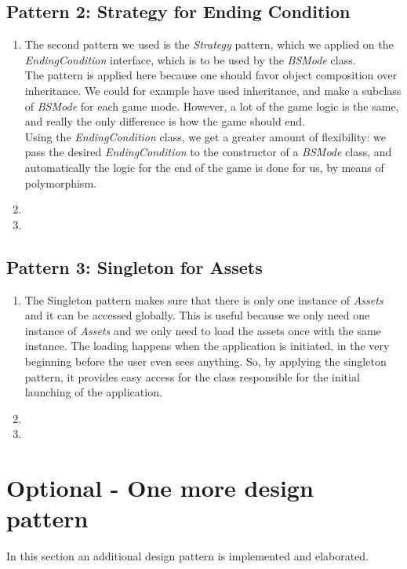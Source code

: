 \documentclass[a4paper,11pt]{article}
\begin{document}
\subsection{Pattern 2: Strategy for Ending Condition}
\begin{enumerate}
\item The second pattern we used is the \textit{Strategy} pattern, which we applied on the \textit{EndingCondition} interface, which is to be used by the \textit{BSMode} class. \\
The pattern is applied here because one should favor object composition over inheritance. We could for example have used inheritance, and make a subclass of \textit{BSMode} for each game mode. However, a lot of the game logic is the same, and really the only difference is how the  game should end.\\
Using the \textit{EndingCondition} class, we get a greater amount of flexibility: we pass the desired \textit{EndingCondition} to the constructor of a \textit{BSMode} class, and automatically the logic for the end of the game is done for us, by means of polymorphism.\\
\item
\item
\end{enumerate}

\subsection{Pattern 3: Singleton for Assets}
\begin{enumerate}
\item The Singleton pattern makes sure that there is only one instance of \textit{Assets} and it can be accessed globally. This is useful because we only need one instance of \textit{Assets} and we only need to load the assets once with the same instance. The loading happens when the application is initiated, in the very beginning before the user even sees anything. So, by applying the singleton pattern, it provides easy access for the class responsible for the initial launching of the application.
\item
\item
\end{enumerate}


\section{Optional - One more design pattern \\}
In this section an additional design pattern is implemented and elaborated.
\end{document}

